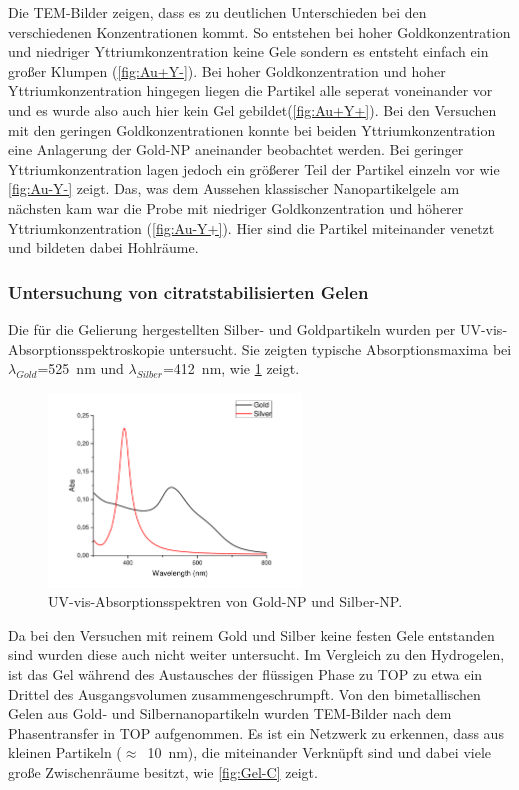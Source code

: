 		Die TEM-Bilder zeigen, dass es zu deutlichen Unterschieden bei den verschiedenen Konzentrationen kommt.
		So entstehen bei hoher Goldkonzentration und niedriger Yttriumkonzentration keine Gele sondern es entsteht einfach ein großer Klumpen (\cref{fig:Au+Y-}).
		Bei hoher Goldkonzentration und hoher Yttriumkonzentration hingegen liegen die Partikel alle seperat voneinander vor und es wurde also auch hier kein Gel gebildet(\cref{fig:Au+Y+}). 
		Bei den Versuchen mit den geringen Goldkonzentrationen konnte bei beiden Yttriumkonzentration eine Anlagerung der Gold-NP aneinander beobachtet werden.
		Bei geringer Yttriumkonzentration lagen jedoch ein größerer Teil der Partikel einzeln vor wie \cref{fig:Au-Y-} zeigt. 
		Das, was dem Aussehen klassischer Nanopartikelgele am nächsten kam war die Probe mit niedriger Goldkonzentration und höherer Yttriumkonzentration (\cref{fig:Au-Y+}). 
		Hier sind die Partikel miteinander venetzt und bildeten dabei Hohlräume.
		
		
		
	 
	
	
	\subsubsection{Untersuchung von citratstabilisierten Gelen}
		
		Die für die Gelierung hergestellten Silber- und Goldpartikeln wurden per UV-vis-Absorptionsspektroskopie untersucht.
		Sie zeigten typische Absorptionsmaxima bei $\lambda_{Gold}$=\SI{525}{\nano\meter} und $\lambda_{Silber}$=\SI{412}{\nano\meter}, wie \cref{fig:Abs-cit} zeigt.
		\begin{figure}[H]
			\centering
			\includegraphics[width=0.6\textwidth]{Bilder/Citrat-NP} 	
			\caption{UV-vis-Absorptionsspektren von Gold-NP und Silber-NP.}
			\label{fig:Abs-cit}
		\end{figure}
	
		Da bei den Versuchen mit reinem Gold und Silber keine festen Gele entstanden sind wurden diese auch nicht weiter untersucht.
		Im Vergleich zu den Hydrogelen, ist das Gel während des Austausches der flüssigen Phase zu TOP zu etwa ein Drittel des Ausgangsvolumen zusammengeschrumpft.
		Von den bimetallischen Gelen aus Gold- und Silbernanopartikeln wurden TEM-Bilder nach dem Phasentransfer in TOP aufgenommen.
		Es ist ein Netzwerk zu erkennen, dass aus kleinen Partikeln ($\approx$~\SI{10}{\nano\meter}), die miteinander Verknüpft sind und dabei viele große Zwischenräume besitzt, wie \cref{fig:Gel-C} zeigt. 
		
